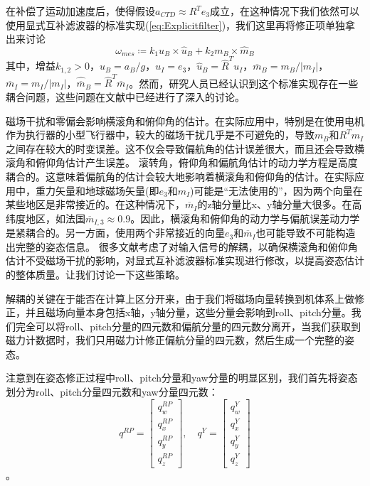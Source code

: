 \documentclass[
  type=master
]{gdutthesis}
\begin{document}
在补偿了运动加速度后，使得假设$a_{CTD} \approx R^T e_3$成立，在这种情况下我们依然可以使用显式互补滤波器的标准实现(\autoref{eq:Explicitfilter})，我们这里再将修正项单独拿出来讨论
\begin{equation}
\omega_{mes} \coloneqq k_1 u_B \times \hat{u}_B + k_2 m_B \times \hat{m}_B	
\end{equation}
其中，增益$k_{1,2}>0$，$u_B = a_B / g$，$u_I = e_3$，$\hat{u}_B = \hat{R}^T u_I$，$\overline{m}_B = m_B / \left| m_I \right|$，$\overline{m}_I = m_I / \left| m_I \right|$，$\hat{\overline{m}}_B = \hat{R}^T \overline{m}_I$。然而，研究人员已经认识到这个标准实现存在一些耦合问题，这些问题在文献\cite{hua2013implementation,hua2011nonlinear,martin2007invariant}中已经进行了深入的讨论。\par
磁场干扰和零偏会影响横滚角和俯仰角的估计。在实际应用中，特别是在使用电机作为执行器的小型飞行器中，较大的磁场干扰几乎是不可避免的，导致$m_B$和$R^T m_I$之间存在较大的时变误差。这不仅会导致偏航角的估计误差很大，而且还会导致横滚角和俯仰角估计产生误差。
滚转角，俯仰角和偏航角估计的动力学方程是高度耦合的。这意味着偏航角的估计会较大地影响着横滚角和俯仰角的估计。在实际应用中，重力矢量和地球磁场矢量(即$e_3$和$m_I$)可能是“无法使用的”，因为两个向量在某些地区是非常接近的。在这种情况下，$\overline{m}_I$的z轴分量比x、y轴分量大很多。在高纬度地区，如法国$\overline{m}_{I,3}\approx 0.9$。因此，横滚角和俯仰角的动力学与偏航误差动力学是紧耦合的。另一方面，使用两个非常接近的向量$e_3$和$\overline{m}_I$也可能导致不可能构造出完整的姿态信息。
很多文献考虑了对输入信号的解耦，以确保横滚角和俯仰角估计不受磁场干扰的影响，对显式互补滤波器标准实现进行修改，以提高姿态估计的整体质量。让我们讨论一下这些策略。\par
解耦的关键在于能否在计算上区分开来，由于我们将磁场向量转换到机体系上做修正，并且磁场向量本身包括x轴，y轴分量，这些分量会影响到roll、pitch分量。我们完全可以将roll、pitch分量的四元数和偏航分量的四元数分离开，当我们获取到磁力计数据时，我们只用磁力计修正偏航分量的四元数，然后生成一个完整的姿态。\par
注意到在姿态修正过程中roll、pitch分量和yaw分量的明显区别，我们首先将姿态划分为roll、pitch分量四元数和yaw分量四元数：
\[
q^{RP} = 
\begin{bmatrix}
	q_w^{RP} \\
	q_x^{RP} \\
	q_y^{RP} \\
	q_z^{RP}
\end{bmatrix},
\hspace{1em}
q^{Y} = 
\begin{bmatrix}
	q_w^{Y} \\
	q_x^{Y} \\
	q_y^{Y} \\
	q_z^{Y}
\end{bmatrix}
\]。
\end{document}

